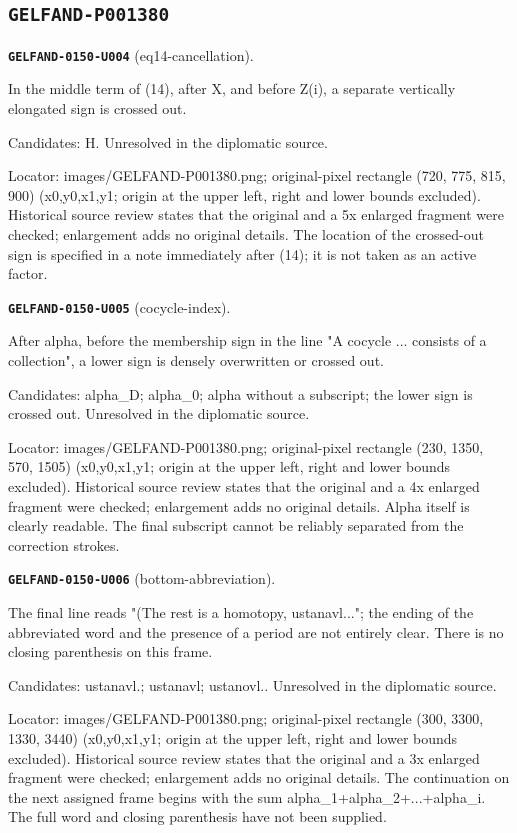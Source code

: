 \documentclass[11pt]{article}
\theoremstyle{definition}
\theoremstyle{remark}
\begin{document}
\subsection*{\texttt{GELFAND-P001380}}
\noindent\leavevmode{}\label{GELFAND-P001380:eq14-cancellation:note}\textbf{\texttt{GELFAND-0150-U004}} (eq14-cancellation).\par\nopagebreak[4]
In the middle term of (14), after X, and before Z(i), a separate vertically elongated sign is crossed out.\par
Candidates: H. Unresolved in the diplomatic source.\par
Locator: images/GELFAND-P001380.png; original-pixel rectangle (720, 775, 815, 900) (x0,y0,x1,y1; origin at the upper left, right and lower bounds excluded). Historical source review states that the original and a 5x enlarged fragment were checked; enlargement adds no original details. The location of the crossed-out sign is specified in a note immediately after (14); it is not taken as an active factor.\par\medskip
\noindent\leavevmode{}\label{GELFAND-P001380:cocycle-index:note}\textbf{\texttt{GELFAND-0150-U005}} (cocycle-index).\par\nopagebreak[4]
After alpha, before the membership sign in the line "A cocycle ... consists of a collection", a lower sign is densely overwritten or crossed out.\par
Candidates: alpha\_D; alpha\_0; alpha without a subscript; the lower sign is crossed out. Unresolved in the diplomatic source.\par
Locator: images/GELFAND-P001380.png; original-pixel rectangle (230, 1350, 570, 1505) (x0,y0,x1,y1; origin at the upper left, right and lower bounds excluded). Historical source review states that the original and a 4x enlarged fragment were checked; enlargement adds no original details. Alpha itself is clearly readable. The final subscript cannot be reliably separated from the correction strokes.\par\medskip
\noindent\leavevmode{}\label{GELFAND-P001380:bottom-abbreviation:note}\textbf{\texttt{GELFAND-0150-U006}} (bottom-abbreviation).\par\nopagebreak[4]
The final line reads "(The rest is a homotopy, ustanavl..."; the ending of the abbreviated word and the presence of a period are not entirely clear. There is no closing parenthesis on this frame.\par
Candidates: ustanavl.; ustanavl; ustanovl.. Unresolved in the diplomatic source.\par
Locator: images/GELFAND-P001380.png; original-pixel rectangle (300, 3300, 1330, 3440) (x0,y0,x1,y1; origin at the upper left, right and lower bounds excluded). Historical source review states that the original and a 3x enlarged fragment were checked; enlargement adds no original details. The continuation on the next assigned frame begins with the sum alpha\_1+alpha\_2+...+alpha\_i. The full word and closing parenthesis have not been supplied.\par\medskip
\end{document}
